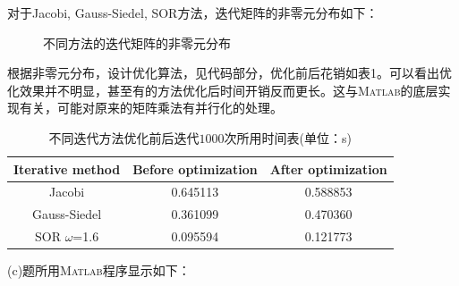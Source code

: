 \documentclass[12pt,a4paper,UTF8]{ctexart}
\begin{document}
\begin{enumerate}
          对于Jacobi, Gauss-Siedel, SOR方法，迭代矩阵的非零元分布如下：
          \begin{figure}[H] \centering
              \caption{不同方法的迭代矩阵的非零元分布}
              \label{fig}
          \end{figure}


          根据非零元分布，设计优化算法，见代码部分，优化前后花销如表1。可以看出优化效果并不明显，甚至有的方法优化后时间开销反而更长。这与\textsc{Matlab}的底层实现有关，可能对原来的矩阵乘法有并行化的处理。
          \begin{table}[H]
              \centering
              \begin{tabular}{|c|c|c|}
                  \hline
                  \textbf{Iterative method} & \textbf{Before optimization} & \textbf{After optimization} \\ \hline
                  Jacobi                    & 0.645113                     & 0.588853                    \\ \hline
                  Gauss-Siedel              & 0.361099                     & 0.470360                    \\ \hline
                  SOR $\omega$=1.6          & 0.095594                     & 0.121773                    \\ \hline
              \end{tabular}
              \caption{不同迭代方法优化前后迭代$1000$次所用时间表(单位：s)}
              \label{tb1}
          \end{table}
          (c)题所用\textsc{Matlab}程序显示如下：
          \begin{lstlisting}[frame=single]
% Jacobi Part:


\end{lstlisting}
\end{enumerate}
\end{document}
